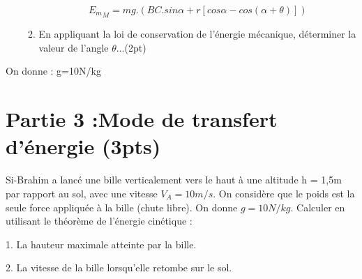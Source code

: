 \documentclass[12pt]{article}
\begin{document}
\begin{enumerate}
\begin{enumerate}
                        $${E_m}_M = mg.(BC.sin\alpha + r[cos\alpha - cos(\alpha + \theta)])$$                    \item En appliquant la loi de conservation de l’énergie mécanique, déterminer la valeur de l’angle $\theta$...\dotfill(2pt)
                \end{enumerate}
\end{enumerate}
On donne : g=10N/kg

\section*{Partie 3 :Mode de transfert d’énergie (3pts)}

Si-Brahim a lancé une bille verticalement vers le haut à une altitude
h = 1,5m par rapport au sol, avec une vitesse $V_A= 10 m/s$.
On considère que le poids est la seule force appliquée à la
bille (chute libre).
On donne $g = 10 N/kg$.
Calculer en utilisant le théorème de l’énergie cinétique :

   1. La hauteur maximale atteinte par la bille.

   2. La vitesse de la bille lorsqu’elle retombe sur le sol.
\end{document}
